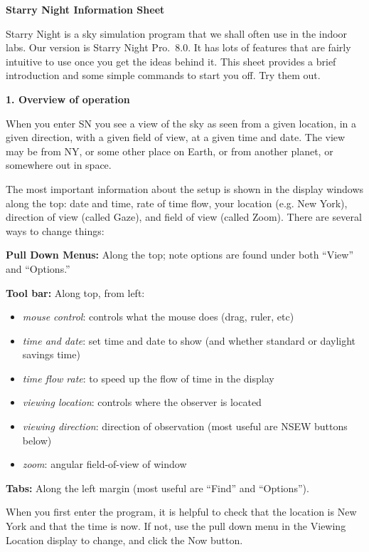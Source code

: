 \noindent
{\hfill \Large {\bf Starry Night Information Sheet} \hfill}


\bigskip

\noindent
Starry Night is a sky simulation program that we shall often use in
the indoor labs. Our version is Starry Night Pro.\ 8.0. It has lots of
features that are fairly intuitive to use once you get the ideas
behind it. This sheet provides a brief introduction and some simple
commands to start you off. Try them out.

\bigskip
\noindent
{\bf 1. Overview of operation}

\smallskip
\noindent
When you enter SN you see a view of the sky as seen from a given
location, in a given direction, with a given field of view,
at a given time and date. The view may be from NY,
or some other place on Earth, or from another planet, or somewhere out
in space.

The most important information about the setup is
shown in the display windows along the top: date and time, rate of
time flow, your location (e.g. New York), direction of view (called
Gaze), and field of view (called Zoom). There are several ways to
change things:

\medskip
{\bf Pull Down Menus:} Along the top; note options are found
under both ``View'' and ``Options.''

\medskip
{\bf Tool bar:} Along top, from left:
\begin{itemize}
\item {\it mouse control}: controls what the mouse does (drag, ruler,
  etc)
\item {\it time and date}: set time and date to show (and whether
  standard or daylight savings time)
\item {\it time flow rate}: to speed up the flow of time in the
  display
\item {\it viewing location}: controls where the observer is located
\item {\it viewing direction}: direction of observation (most useful
  are NSEW buttons below)
\item {\it zoom}: angular field-of-view of window
\end{itemize}

\medskip
{\bf Tabs:} Along the left margin (most useful are ``Find'' and
``Options'').
\medskip

\medskip
\noindent
When you first enter the program, it is helpful to check that the
location is New York and that the time is now. If not, use the pull
down menu in the Viewing Location display to change, and click the Now button.

